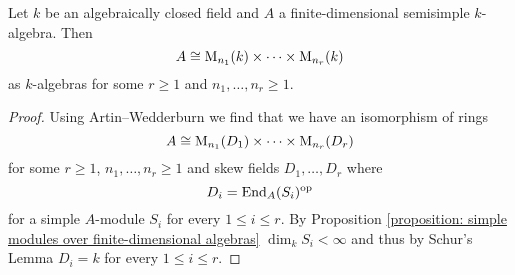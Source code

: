 \begin{corollary}\label{corollary: semisimple algebra product of matrix algebras over field}
  Let $k$ be an algebraically closed field and $A$ a finite-dimensional semisimple $k$-algebra.
  Then
  \[
    A \cong \operatorname{M}_{n_1}(k) \times \dotsm \times \operatorname{M}_{n_r}(k)
  \]
  as $k$-algebras for some $r \geq 1$ and $n_1, \dotsc, n_r \geq 1$.
\end{corollary}
\begin{proof}
  Using Artin--Wedderburn we find that we have an isomorphism of rings
  \[
    A \cong \operatorname{M}_{n_1}(D_1) \times \dotsm \times \operatorname{M}_{n_r}(D_r)
  \]
  for some $r \geq 1$, $n_1, \dotsc, n_r \geq 1$ and skew fields $D_1, \dotsc, D_r$ where
  \[
    D_i = \operatorname{End}_A(S_i)^{\mathrm{op}}
  \]
  for a simple $A$-module $S_i$ for every $1 \leq i \leq r$.
  By Proposition \ref{proposition: simple modules over finite-dimensional algebras} $\dim_k S_i < \infty$ and thus by Schur’s Lemma $D_i = k$ for every $1 \leq i \leq r$.
\end{proof}


